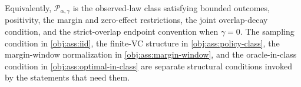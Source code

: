 Equivalently, \(\mathcal P_{\alpha,\gamma}\) is the observed-law class satisfying bounded outcomes, positivity, the margin and zero-effect restrictions, the joint overlap-decay condition, and the strict-overlap endpoint convention when \(\gamma=0\).  The sampling condition in \cref{obj:ass:iid}, the finite-VC structure in \cref{obj:ass:policy-class}, the margin-window normalization in \cref{obj:ass:margin-window}, and the oracle-in-class condition in \cref{obj:ass:optimal-in-class} are separate structural conditions invoked by the statements that need them.
